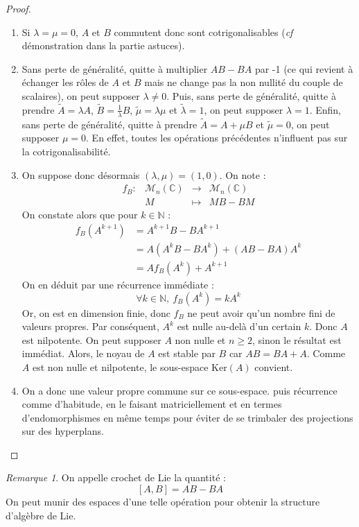 \documentclass[french,a4paper]{article}
\newcommand{\N}{\mathbb{N}}
\newcommand{\C}{\mathbb{C}}
\renewcommand{\ker}{\text{Ker}}
\theoremstyle{plain}
\theoremstyle{definition}
\theoremstyle{remark}
\newtheorem*{rmq}{Remarque}
\begin{document}
\begin{proof}
	\begin{enumerate}
		\item Si $\lambda=\mu=0$, $A$ et $B$ commutent donc sont cotrigonalisables (\textit{cf} démonstration dans la partie astuces).
		\item Sans perte de généralité, quitte à multiplier $AB-BA$ par -1 (ce qui revient à échanger les rôles de $A$ et $B$ mais ne change pas la non nullité du couple de scalaires), on peut supposer $\lambda\ne0$. Puis, sans perte de généralité, quitte à prendre $\tilde{A}=\lambda A$, $\tilde{B}=\frac{1}{\lambda}B$, $\tilde{\mu}=\lambda\mu$ et $\tilde{\lambda}=1$, on peut supposer $\lambda=1$. Enfin, sans perte de généralité, quitte à prendre $\tilde{A}=A+\mu B$ et $\tilde{\mu}=0$, on peut supposer $\mu=0$. En effet, toutes les opérations précédentes n'influent pas sur la cotrigonalisabilité.
		\item On suppose donc désormais $(\lambda,\mu)=(1,0)$. On note : $$\begin{array}{lrcl}
			f_B:&\mathcal{M}_n(\C)&\longrightarrow&\mathcal{M}_n(\C)\\
			&M&\longmapsto&MB-BM
		\end{array}$$ On constate alors que pour $k\in\N$ : \begin{align*}
			f_B(A^{k+1})&=A^{k+1}B-BA^{k+1} \\
			&=A(A^kB-BA^k)+(AB-BA)A^k \\
			&=Af_B(A^k)+A^{k+1}
		\end{align*} On en déduit par une récurrence immédiate : $$\forall k\in\N,\ f_B(A^k)=kA^k$$ Or, on est en dimension finie, donc $f_B$ ne peut avoir qu'un nombre fini de valeurs propres. Par conséquent, $A^k$ est nulle au-delà d'un certain $k$. Donc $A$ est nilpotente. On peut supposer $A$ non nulle et $n\geqslant 2$, sinon le résultat est immédiat. Alors, le noyau de $A$ est stable par $B$ car $AB=BA+A$. Comme $A$ est non nulle et nilpotente, le sous-espace $\ker(A)$ convient.
		\item On a donc une valeur propre commune sur ce sous-espace. puis récurrence comme d'habitude, en le faisant matriciellement et en termes d'endomorphismes en même temps pour éviter de se trimbaler des projections sur des hyperplans. 
	\end{enumerate}
\end{proof}
\begin{rmq}
	On appelle crochet de Lie la quantité : $$[A,B]=AB-BA$$ On peut munir des espaces d'une telle opération pour obtenir la structure d'algèbre de Lie.
\end{rmq}
\end{document}

